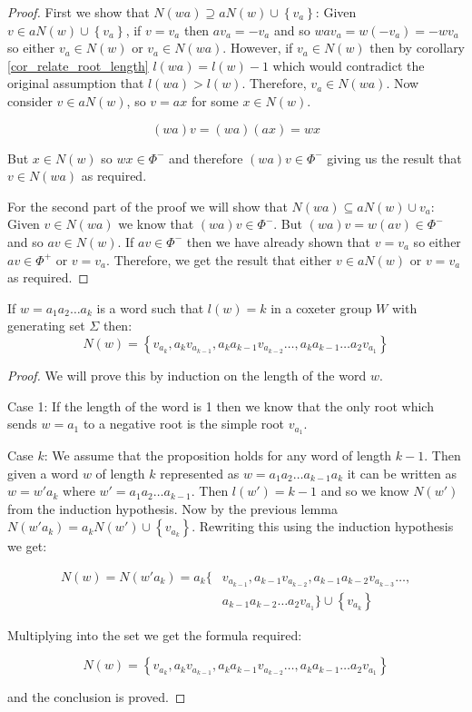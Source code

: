 \documentclass[a4paper,12pt]{article}
\begin{document}
\begin{proof}
	First we show that $N(wa) \supseteq aN(w) \cup \left\{v_a\right\}$: Given $v \in aN(w) \cup \left\{v_a\right\}$, if $v = v_a$ then $av_a = -v_a$ and so $wav_a = w(-v_a) = -wv_a$ so either $v_a \in N(w)$ or $v_a \in N(wa)$. However, if $v_a \in N(w)$ then by corollary \ref{cor_relate_root_length} $l(wa) = l(w) - 1$ which would contradict the original assumption that $l(wa) > l(w)$. Therefore, $v_a \in N(wa)$. Now consider $v \in aN(w)$, so $v = ax$ for some $x \in N(w)$.
	
\[(wa)v = (wa)(ax) = wx\]

But $x \in N(w)$ so $wx \in \Phi^-$ and therefore $(wa)v \in \Phi^-$ giving us the result that $v \in N(wa)$ as required.

For the second part of the proof we will show that $N(wa) \subseteq aN(w) \cup {v_a}$: Given $v \in N(wa)$ we know that $(wa)v \in \Phi^-$. But $(wa)v = w(av) \in \Phi^-$ and so $av \in N(w)$. If $av \in \Phi^-$ then we have already shown that $v = v_a$ so either $av \in \Phi^+$ or $v = v_a$. Therefore, we get the result that either $v \in aN(w)$ or $v = v_a$ as required.
\end{proof}

\begin{prop}
	If $w = a_1a_2 \ldots a_k$ is a word such that $l(w) = k$ in a coxeter group $W$ with generating set $\Sigma$ then:
	\[N(w) = \left\{v_{a_k}, a_kv_{a_{k - 1}}, a_ka_{k - 1}v_{a_{k - 2}} \ldots, a_ka_{k - 1} \ldots a_2v_{a_1}\right\}\]
\end{prop}

\begin{proof}
	We will prove this by induction on the length of the word $w$.
	
	Case 1: If the length of the word is 1 then we know that the only root which sends $w = a_1$ to a negative root is the simple root $v_{a_1}$.
	
	Case $k$: We assume that the proposition holds for any word of length $k - 1$. Then given a word $w$ of length $k$ represented as $w = a_1a_2 \ldots a_{k-1}a_k$ it can be written as $w = w'a_k$ where $w' = a_1a_2 \ldots a_{k-1}$. Then $l(w') = k - 1$ and so we know $N(w')$ from the induction hypothesis. Now by the previous lemma $N(w'a_k) = a_kN(w') \cup \left\{v_{a_k}\right\}$. Rewriting this using the induction hypothesis we get:
	
	\begin{align*}
	N(w) = N(w'a_k) = a_k\{ & v_{a_{k-1}}, a_{k-1}v_{a_{k - 2}}, a_{k-1}a_{k - 2}v_{a_{k - 3}} \ldots, \\
	                        & a_{k-1}a_{k - 2} \ldots a_2v_{a_1}\} \cup \left\{v_{a_k}\right\}
	\end{align*}
	
	Multiplying into the set we get the formula required:
	
	\[N(w) = \left\{v_{a_k}, a_kv_{a_{k - 1}}, a_ka_{k - 1}v_{a_{k - 2}} \ldots, a_ka_{k - 1} \ldots a_2v_{a_1}\right\}\]
	
	and the conclusion is proved.
	
\end{proof}
\end{document}

